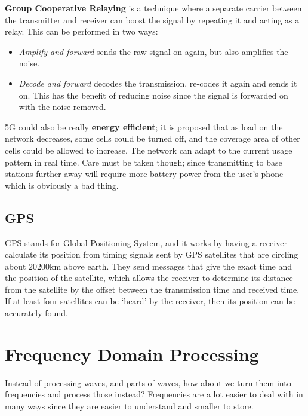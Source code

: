 \textbf{Group Cooperative Relaying} is a technique where a separate carrier
between the transmitter and receiver can boost the signal by repeating it and
acting as a relay. This can be performed in two ways:

\begin{itemize}
  \item \textit{Amplify and forward} sends the raw signal on again, but also
  amplifies the noise.
  \item \textit{Decode and forward} decodes the transmission, re-codes it again
  and sends it on. This has the benefit of reducing noise since the signal
  is forwarded on with the noise removed.
\end{itemize}

5G could also be really \textbf{energy efficient}; it is proposed that as load
on the network decreases, some cells could be turned off, and the coverage area
of other cells could be allowed to increase. The network can adapt to the
current usage pattern in real time. Care must be taken though; since
transmitting to base stations further away will require more battery power from
the user's phone which is obviously a bad thing.

\subsection{GPS}

GPS stands for Global Positioning System, and it works by having a receiver
calculate its position from timing signals sent by GPS satellites that are
circling about $20200\si{\kilo\meter}$ above earth. They send messages that give
the exact time and the position of the satellite, which allows the receiver to
determine its distance from the satellite by the offset between the transmission
time and received time. If at least four satellites can be `heard' by the
receiver, then its position can be accurately found.


\section{Frequency Domain Processing}

Instead of processing waves, and parts of waves, how about we turn them into
frequencies and process those instead? Frequencies are a lot easier to deal with
in many ways since they are easier to understand and smaller to store.

